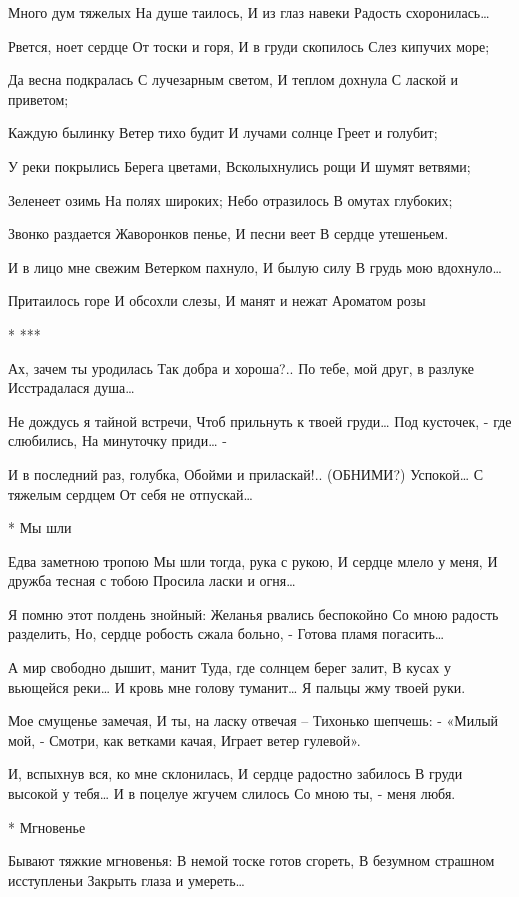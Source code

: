 Много дум тяжелых
На душе таилось,
И из глаз навеки
Радость схоронилась…

Рвется, ноет сердце
От тоски и горя,
И в груди скопилось
Слез кипучих море;

Да весна подкралась
С лучезарным светом,
И теплом дохнула
С лаской и приветом;

Каждую былинку
Ветер тихо будит
И лучами солнце
Греет и голубит;

У реки покрылись
Берега цветами,
Всколыхнулись рощи
И шумят ветвями;

Зеленеет озимь
На полях широких;
Небо отразилось
В омутах глубоких;

Звонко раздается
Жаворонков пенье,
И песни веет
В сердце утешеньем.

И в лицо мне свежим
Ветерком пахнуло,
И былую силу
В грудь мою вдохнуло…

Притаилось горе
И обсохли слезы,
И манят и нежат
Ароматом розы



* ***

Ах, зачем ты уродилась
Так добра и хороша?..
По тебе, мой друг, в разлуке
Исстрадалася душа…

Не дождусь я тайной встречи,
Чтоб прильнуть к твоей груди…
Под кусточек, - где слюбились,
На минуточку приди… -

И в последний раз, голубка,
Обойми и приласкай!.. (ОБНИМИ?)
Успокой… С тяжелым сердцем
От себя не отпускай…


* Мы шли

Едва заметною тропою
Мы шли тогда, рука с рукою,
И сердце млело у меня,
И дружба тесная с тобою
Просила ласки и огня…

Я помню этот полдень знойный:
Желанья рвались беспокойно
Со мною радость разделить,
Но, сердце робость сжала больно, -
Готова пламя погасить…

А мир свободно дышит, манит
Туда, где солнцем берег залит,
В кусах у вьющейся реки…
И кровь мне голову туманит…
Я пальцы жму твоей руки.

Мое смущенье замечая,
И ты, на ласку отвечая –
Тихонько шепчешь: - «Милый мой, -
Смотри, как ветками качая,
Играет ветер гулевой».

И, вспыхнув вся, ко мне склонилась,
И сердце радостно забилось
В груди высокой у тебя…
И в поцелуе жгучем слилось
Со мною ты, - меня любя.


* Мгновенье

Бывают тяжкие мгновенья:
В немой тоске готов сгореть,
В безумном страшном исступленьи
Закрыть глаза и умереть…


